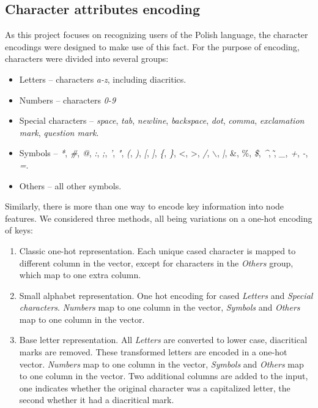 \subsection{Character attributes encoding}
\label{Base_letter_representation}
As this project focuses on recognizing users of the Polish language, the character encodings were designed to make use of this fact. For the purpose of encoding, characters were divided into several groups:\\
\begin{itemize}
	\item Letters -- characters \textit{a-z}, including diacritics.
	\item Numbers -- characters \textit{0-9}
	\item Special characters -- \textit{space}, \textit{tab}, \textit{newline}, \textit{backspace}, \textit{dot}, \textit{comma}, \textit{exclamation mark}, \textit{question mark}.
	\item Symbols -- \textit{*}, \textit{\#}, \textit{@}, \textit{:}, \textit{;},   \textit{'}, \textit{"}, \textit{(}, \textit{)}, \textit{[}, \textit{]}, \textit{\{}, \textit{\}}, \textless, \textgreater, \textit{/}, \textit{$\backslash$}, \textit{|}, \&, \%, \textit{\$}, \textit{\^}, \~, \textit{\_}, \textit{+}, \textit{-}, \textit{=}. 
	\item Others -- all other symbols.
\end{itemize}
Similarly, there is more than one way to encode key information into node features.
We considered three methods, all being variations on a one-hot encoding of keys:
\begin{enumerate}
	\item Classic one-hot representation. Each unique cased character is mapped to different column in the vector, except for characters in the \textit{Others} group, which map to one extra column.
	\item Small alphabet representation. One hot encoding for cased \textit{Letters} and \textit{Special characters}. \textit{Numbers} map to one column in the vector, \textit{Symbols} and \textit{Others} map to one column in the vector.
	\item Base letter representation. All \textit{Letters} are converted to lower case, diacritical marks are removed. These transformed letters are encoded in a one-hot vector. \textit{Numbers} map to one column in the vector, \textit{Symbols} and \textit{Others} map to one column in the vector. Two additional columns are added to the input, one indicates whether the original character was a capitalized letter, the second whether it had a diacritical mark.
\end{enumerate}



